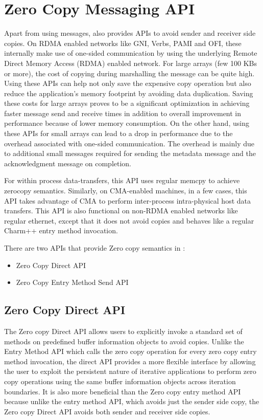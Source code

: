 \section{Zero Copy Messaging API}

\label{nocopyapi}
Apart from using messages, \charmpp{} also provides APIs to avoid sender
and receiver side copies. On RDMA enabled networks like GNI, Verbs, PAMI and
OFI, these internally make use of one-sided communication by using the
underlying Remote Direct Memory Access (RDMA) enabled network.
For large arrays (few 100 KBs or more), the cost of copying during marshalling
the message can be quite high. Using these APIs can help not only save the
expensive copy operation but also reduce the application's memory footprint by
avoiding data duplication. Saving these costs for large arrays proves to be a
significant optimization in achieving faster message send and receive times in
addition to overall improvement in performance because of lower memory consumption.
On the other hand, using these APIs for small arrays can lead to a drop in
performance due to the overhead associated with one-sided communication. The overhead
is mainly due to additional small messages required for sending the metadata message
and the acknowledgment message on completion.

For within process data-transfers, this API uses regular memcpy to achieve zerocopy
semantics. Similarly, on CMA-enabled machines, in a few cases, this API takes
advantage of CMA to perform inter-process intra-physical host data transfers. This
API is also functional on non-RDMA enabled networks like regular ethernet, except that
it does not avoid copies and behaves like a regular Charm++ entry method invocation.

There are two APIs that provide Zero copy semantics in \charmpp{}:
\begin{itemize}
\item Zero Copy Direct API
\item Zero Copy Entry Method Send API
\end{itemize}

\subsection{Zero Copy Direct API}
The Zero copy Direct API allows users to explicitly invoke a standard set of
methods on predefined buffer information objects to avoid copies. Unlike the
Entry Method API which calls the zero copy operation for every zero copy entry
method invocation, the direct API provides a more flexible interface by allowing
the user to exploit the persistent nature of iterative applications to perform
zero copy operations using the same buffer information objects across iteration
boundaries. It is also more beneficial than the Zero copy entry method API because
unlike the entry method API, which avoids just the sender side copy, the Zero copy
Direct API avoids both sender and receiver side copies.

